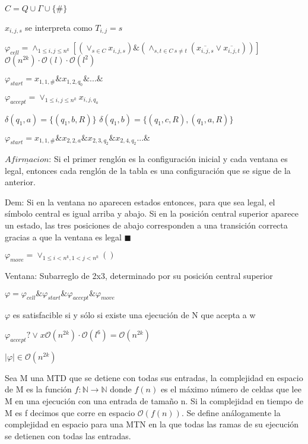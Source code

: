 \documentclass{homework}
\begin{document}
$C = Q \cup \Gamma \cup \{\#\}$

$x_{i,j,s}$ se interpreta como $T_{i,j} = s$

$\varphi_{cell} = \wedge_{1 \leq i, j \leq n^k} [(\vee_{s \in C} x_{i,j,s}) \& (\wedge_{s,t \in C  \ s \neq t}(\overline{x_{i,j,s}} \vee \overline{x_{i,j,t}}))]$ $\mathcal{O}(n^{2k}) \cdot \mathcal{O}(l) \cdot \mathcal{O}(l^2)$

$\varphi_{start} = x_{1,1,\#} \& x_{1,2,q_0} \& ... \&$


$\varphi_{accept} = \vee_{1 \leq i, j \leq n^k} x_{i,j,q_a}$

$\delta (q_1, a) = \{(q_1, b, R)\}$
$\delta (q_1, b) = \{(q_1, c, R), (q_1,a,R)\}$

$\varphi_{start} = x_{1,1,\#} \& x_{2,2,a} \& x_{2,3,q_2} \& x_{2,4,q_2}... \&$

$\underline{Afirmacion}$: Si el primer renglón es la configuración inicial y cada ventana es legal, entonces cada renglón de la tabla es una configuración que se sigue de la anterior.

Dem: Si en la ventana no aparecen estados entonces, para que sea legal, el símbolo central es igual arriba y abajo. Si en la posición central superior aparece un estado, las tres posiciones de abajo corresponden a una transición correcta gracias a que la ventana es legal $\blacksquare$

$\varphi_{move} = \vee_{1 \leq i < n^k, 1 < j < n^k} ()$

Ventana: Subarreglo de 2x3, determinado por su posición central superior


$\varphi = \varphi_{cell} \& \varphi_{start} \& \varphi_{accept} \& \varphi_{move}$

$\varphi$ es satisfacible si y sólo si existe una ejecución de N que acepta a w

$\varphi_{accept} ? \vee_{}x \mathcal{O}(n^{2k}) \cdot \mathcal{O}(l^6) =  \mathcal{O}(n^{2k}) $

$|\varphi| \in \mathcal{O}(n^{2k})$

Sea M una MTD que se detiene con todas sus entradas, la complejidad en espacio de M es la función $f: \mathds{N} \rightarrow \mathds{N}$ donde $f(n)$ es el máximo número de celdas que lee M en una ejecución con una entrada de tamaño n. Si la complejidad en tiempo de M es f decimos que corre en espacio $\mathcal{O}(f(n))$. Se define análogamente la complejidad en espacio para una MTN en la que todas las ramas de su ejecución se detienen con todas las entradas.
\end{document}

